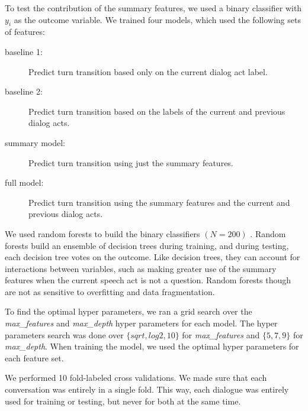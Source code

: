     To test the contribution of the summary features, we used a binary classifier with
    $y_i$ as the outcome variable. We trained four models, which used the following sets of features:

    \begin{description}
        \item[baseline 1:] Predict turn transition based only on the current dialog act label.
        \item[baseline 2:] Predict turn transition based on the labels of the current and previous dialog acts.
        \item[summary model:] Predict turn transition using just the summary features.
        \item[full model:] Predict turn transition using the summary features and the current and previous dialog acts.
    \end{description}


We used random forests to build the binary classifiers $(N=200)$ \cite{Breiman01randomforests}. Random forests build an ensemble of decision trees during training, and during testing, each decision tree votes on the outcome.  Like decision trees, they can account for interactions between variables, such as making greater use of the summary features when the current speech act is not a question.  Random forests though are not as sensitive to overfitting and data fragmentation.

To find the optimal hyper parameters, we ran a grid search over the \textit{max\_features} and \textit{max\_depth} hyper parameters for each model. The hyper parameters search was done over $\{sqrt, log2, 10\}$ for \textit{max\_features} and $\{5, 7, 9\}$ for \textit{max\_depth}. When training the model, we used the optimal hyper parameters for each feature set.

   We performed 10 fold-labeled cross validations.  We made sure that each conversation was entirely in a single fold. This way, each dialogue was entirely used for training or testing, but never for both at the same time.
